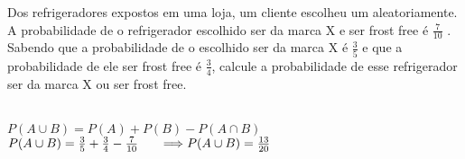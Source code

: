 \begin{ex}
Dos refrigeradores expostos em uma loja, um cliente escolheu um aleatoriamente.  A probabilidade de o refrigerador escolhido ser da marca X e ser frost free é $\frac{7}{10}$ . Sabendo que a probabilidade de o escolhido ser da marca X  é $\frac{3}{5}$ e que a probabilidade de ele ser frost free é $\frac{3}{4}$, calcule a probabilidade de esse refrigerador ser da marca X ou ser frost free.
  \begin{sol} 
   \phantom{A} \\
   $P(A\cup B)=P(A)+P(B)-P(A\cap B)$ \\
   $P(A\cup B)= \frac{3}{5}+\frac{3}{4}-\frac{7}{10} \hspace{0,6cm} \Longrightarrow P(A\cup B)=\frac{13}{20}$
  \end{sol}
\end{ex}
